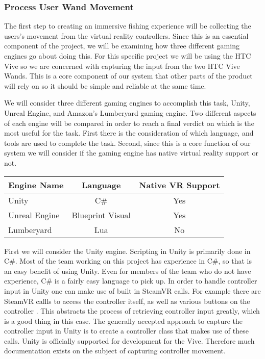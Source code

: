 \documentclass[10pt,journal,compsoc,onecolumn, draftclsnofoot]{IEEEtran}
\begin{document}
\begin{bibunit}
\subsubsection{Process User Wand Movement}
The first step to creating an immersive fishing experience will be collecting the users's movement from the virtual reality controllers.
Since this is an essential component of the project, we will be examining how three different gaming engines go about doing this.
For this specific project we will be using the HTC Vive so we are concerned with capturing the input from the two HTC Vive Wands.
This is a core component of our system that other parts of the product will rely on so it should be simple and reliable at the same time.

We will consider three different gaming engines to accomplish this task, Unity, Unreal Engine, and Amazon's Lumberyard gaming engine.
Two different aspects of each engine will be compared in order to reach a final verdict on which is the most useful for the task.
First there is the consideration of which language, and tools are used to complete the task.
Second, since this is a core function of our system we will consider if the gaming engine has native virtual reality support or not.

\vspace{2mm}
\begin{table}[h!]
\centering
  \begin{tabular}{ | l || c | c |  }
  \hline
  Engine Name & Language & Native VR Support\\
  \hline
  Unity  & C\# & Yes\\ \hline
  Unreal Engine & Blueprint Visual & Yes\\ \hline
  Lumberyard & Lua & No\\ \hline
  \end{tabular}
\end{table}
\vspace{2mm}

First we will consider the Unity engine. Scripting in Unity is primarily done in C\#.
Most of the team working on this project has experience in C\#, so that is an easy benefit of using Unity.
Even for members of the team who do not have experience, C\# is a fairly easy language to pick up.
In order to handle controller input in Unity one can make use of built in SteamVR calls.
For example there are SteamVR callls to access the controller itself, as well as various buttons on the controller \cite{steamvr_controllers}.
This abstracts the process of retrieving controller input greatly, which is a good thing in this case.
The generally accepted approach to capture the controller input in Unity is to create a controller class that makes use of these calls.
Unity is officially supported for development for the Vive.
Therefore much documentation exists on the subject of capturing controller movement.


\end{bibunit}
\end{document}
